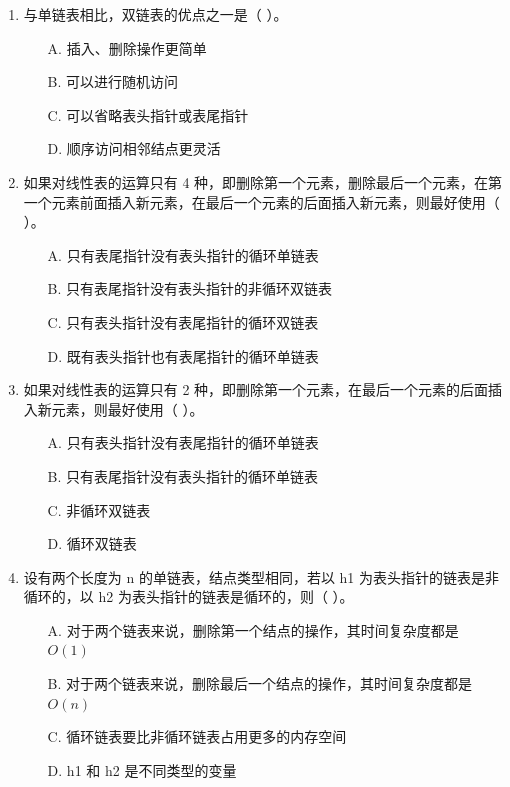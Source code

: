 \documentclass[12pt, a4paper]{article}
\begin{document}
\begin{enumerate}
    \item 与单链表相比，双链表的优点之一是（ ）。
    \begin{enumerate}
        \item[A.] 插入、删除操作更简单
        \item[B.] 可以进行随机访问
        \item[C.] 可以省略表头指针或表尾指针
        \item[D.] 顺序访问相邻结点更灵活
    \end{enumerate}
    
    \item 如果对线性表的运算只有 4 种，即删除第一个元素，删除最后一个元素，在第一个元素前面插入新元素，在最后一个元素的后面插入新元素，则最好使用（ ）。
    \begin{enumerate}
        \item[A.] 只有表尾指针没有表头指针的循环单链表
        \item[B.] 只有表尾指针没有表头指针的非循环双链表
        \item[C.] 只有表头指针没有表尾指针的循环双链表
        \item[D.] 既有表头指针也有表尾指针的循环单链表
    \end{enumerate}
    
    \item 如果对线性表的运算只有 2 种，即删除第一个元素，在最后一个元素的后面插入新元素，则最好使用（ ）。
    \begin{enumerate}
        \item[A.] 只有表头指针没有表尾指针的循环单链表
        \item[B.] 只有表尾指针没有表头指针的循环单链表
        \item[C.] 非循环双链表
        \item[D.] 循环双链表
    \end{enumerate}
    
    \item 设有两个长度为 n 的单链表，结点类型相同，若以 h1 为表头指针的链表是非循环的，以 h2 为表头指针的链表是循环的，则（ ）。
    \begin{enumerate}
        \item[A.] 对于两个链表来说，删除第一个结点的操作，其时间复杂度都是 $O(1)$
        \item[B.] 对于两个链表来说，删除最后一个结点的操作，其时间复杂度都是 $O(n)$
        \item[C.] 循环链表要比非循环链表占用更多的内存空间
        \item[D.] h1 和 h2 是不同类型的变量
    \end{enumerate}
    

\end{enumerate}
\end{document}
